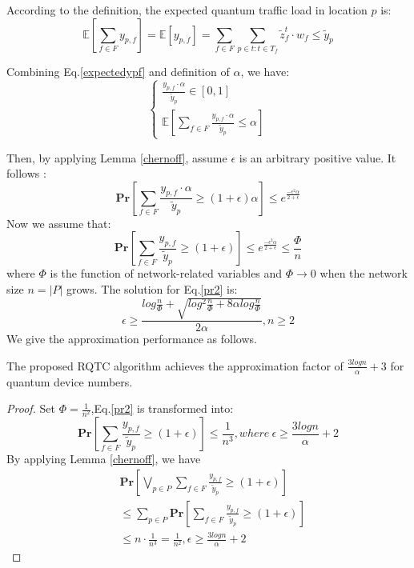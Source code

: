 According to the definition, the expected quantum traffic load in location $p$ is:
\begin{equation}\label{expectedypf}
  \mathbb{E}[\sum_{f \in F}y_{p,f}]= \mathbb{E}[y_{p,f}] = \sum_{f \in F}\sum_{p \in t:t \in T_f}\widetilde{z}_f^t \cdot w_f \le \widetilde{y}_p
\end{equation}

Combining Eq.\ref{expectedypf} and definition of $\alpha$, we have:
\begin{equation}\label{eq:relaxed}
	\begin{cases}
     \frac{y_{p,f} \cdot \alpha}{\widetilde{y}_p} \in [0,1] \\
     \mathbb{E}[\sum_{f \in F} \frac{y_{p,f} \cdot \alpha}{\widetilde{y}_p} \le \alpha]
	\end{cases}
\end{equation}

Then, by applying Lemma \ref{chernoff}, assume $\epsilon$ is an arbitrary positive value. It follows :
\begin{equation}\label{pr1}
  \textbf{Pr}[\sum_{f \in F} \frac{y_{p,f} \cdot \alpha}{\widetilde{y}_p} \ge (1+\epsilon)\alpha] \le e^{\frac{-\epsilon^2\alpha}{2+\epsilon}}
\end{equation}
Now we assume that:
\begin{equation}\label{pr2}
  \textbf{Pr}[\sum_{f \in F} \frac{y_{p,f}}{\widetilde{y}_p} \ge (1+\epsilon)] \le e^{\frac{-\epsilon^2\alpha}{2+\epsilon}} \le \frac{\Phi}{n}
\end{equation}
where $\Phi$ is the function of network-related variables and $\Phi \rightarrow 0$ when the network size $n = |P|$ grows. The solution for Eq.\ref{pr2} is:
\begin{equation}\label{solution}
  \epsilon \ge \frac{log\frac{n}{\Phi}+\sqrt{log^2\frac{n}{\Phi}+8\alpha log\frac{n}{\Phi}}}{2\alpha},n \ge 2
\end{equation}
We give the approximation performance as follows.
\begin{theorem}
The proposed RQTC algorithm achieves the approximation factor of $\frac{3logn}{\alpha}+3$ for quantum device numbers.
\end{theorem}
\begin{proof}
Set $\Phi = \frac{1}{n^2}$,Eq.\ref{pr2} is transformed into:
\begin{equation}
    \textbf{Pr}[\sum_{f \in F} \frac{y_{p,f}}{\widetilde{y}_p} \ge (1+\epsilon)] \le \frac{1}{n^3},where \ \epsilon \ge \frac{3logn}{\alpha}+2
\end{equation}
By applying Lemma \ref{chernoff}, we have
\begin{equation}
\begin{aligned}
    &\textbf{Pr}[\bigvee_{p \in P}\sum_{f \in F} \frac{y_{p,f}}{\widetilde{y}_p} \ge (1+\epsilon)]\\ &\le \sum_{p \in P}\textbf{Pr}[\sum_{f \in F} \frac{y_{p,f}}{\widetilde{y}_p} \ge (1+\epsilon)]\\
    &\le n\cdot \frac{1}{n^3} = \frac{1}{n^2}, \epsilon \ge \frac{3logn}{\alpha}+2
\end{aligned}
\end{equation}
\end{proof}

